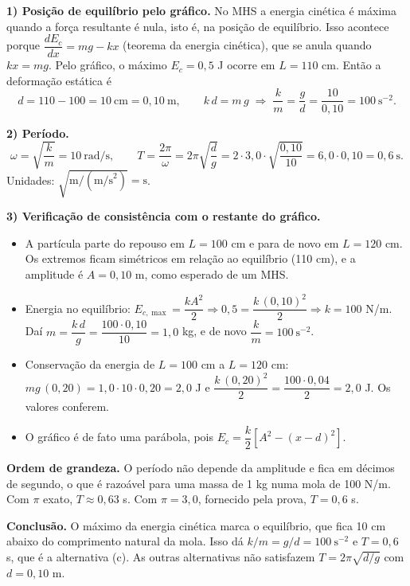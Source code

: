 \documentclass{article}%
\begin{document}
\textbf{1) Posição de equilíbrio pelo gráfico.} No MHS a energia cinética é máxima quando a força resultante é nula, isto é, na posição de equilíbrio. Isso acontece porque $\dfrac{dE_c}{dx} = mg - kx$ (teorema da energia cinética), que se anula quando $kx = mg$. Pelo gráfico, o máximo $E_c = 0{,}5$ J ocorre em $L = 110$ cm. Então a deformação estática é
\[
d = 110 - 100 = 10\ \text{cm} = 0{,}10\ \text{m},
\qquad k\,d = m\,g \;\Rightarrow\; \frac{k}{m} = \frac{g}{d} = \frac{10}{0{,}10} = 100\ \text{s}^{-2}.
\]

\textbf{2) Período.}
\[
\omega = \sqrt{\frac{k}{m}} = 10\ \text{rad/s},
\qquad
T = \frac{2\pi}{\omega} = 2\pi\sqrt{\frac{d}{g}} = 2\cdot 3{,}0\cdot\sqrt{\frac{0{,}10}{10}} = 6{,}0\cdot 0{,}10 = 0{,}6\ \text{s}.
\]
Unidades: $\sqrt{\text{m}/(\text{m/s}^2)} = \text{s}$.

\textbf{3) Verificação de consistência com o restante do gráfico.}
\begin{itemize}
\item A partícula parte do repouso em $L = 100$ cm e para de novo em $L = 120$ cm. Os extremos ficam simétricos em relação ao equilíbrio (110 cm), e a amplitude é $A = 0{,}10$ m, como esperado de um MHS.
\item Energia no equilíbrio: $E_{c,\max} = \dfrac{kA^2}{2} \Rightarrow 0{,}5 = \dfrac{k\,(0{,}10)^2}{2} \Rightarrow k = 100$ N/m. Daí $m = \dfrac{k\,d}{g} = \dfrac{100\cdot 0{,}10}{10} = 1{,}0$ kg, e de novo $\dfrac{k}{m} = 100\ \text{s}^{-2}$.
\item Conservação da energia de $L = 100$ cm a $L = 120$ cm: $mg\,(0{,}20) = 1{,}0\cdot 10\cdot 0{,}20 = 2{,}0$ J e $\dfrac{k\,(0{,}20)^2}{2} = \dfrac{100\cdot 0{,}04}{2} = 2{,}0$ J. Os valores conferem.
\item O gráfico é de fato uma parábola, pois $E_c = \dfrac{k}{2}\left[A^2 - (x-d)^2\right]$.
\end{itemize}

\textbf{Ordem de grandeza.} O período não depende da amplitude e fica em décimos de segundo, o que é razoável para uma massa de 1 kg numa mola de 100 N/m. Com $\pi$ exato, $T \approx 0{,}63$ s. Com $\pi = 3{,}0$, fornecido pela prova, $T = 0{,}6$ s.

\textbf{Conclusão.} O máximo da energia cinética marca o equilíbrio, que fica 10 cm abaixo do comprimento natural da mola. Isso dá $k/m = g/d = 100\ \text{s}^{-2}$ e $T = 0{,}6$ s, que é a alternativa (c). As outras alternativas não satisfazem $T = 2\pi\sqrt{d/g}$ com $d = 0{,}10$ m.
\end{document}
